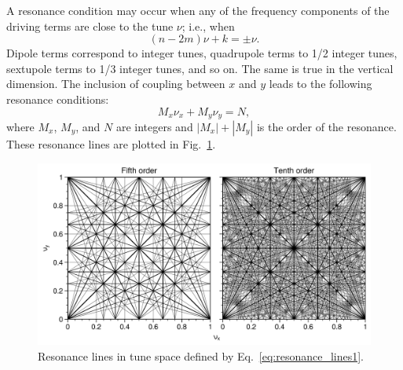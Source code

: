 %
A resonance condition may occur when any of the frequency components of the driving terms are close to the tune $\nu$; i.e., when
%
\begin{equation}
    (n - 2m)\nu + k = \pm \nu.
\end{equation}
%
Dipole terms correspond to integer tunes, quadrupole terms to 1/2 integer tunes, sextupole terms to 1/3 integer tunes, and so on. The same is true in the vertical dimension. The inclusion of coupling between $x$ and $y$ leads to the following resonance conditions:
%
\begin{equation}\label{eq:resonance_lines1}
    M_x \nu_x + M_y \nu_y = N,
\end{equation}
%
where $M_x$, $M_y$, and $N$ are integers and $|M_x| + |M_y|$ is the order of the resonance. These resonance lines are plotted in Fig.~\ref{fig:resonance_lines}.
%
\begin{figure}[!p]
    \centering
    \includegraphics[width=\textwidth]{Images/chapter1/resonance_lines.png}
    \caption{Resonance lines in tune space defined by Eq.~\eqref{eq:resonance_lines1}.}
    \label{fig:resonance_lines}
\end{figure}
%
